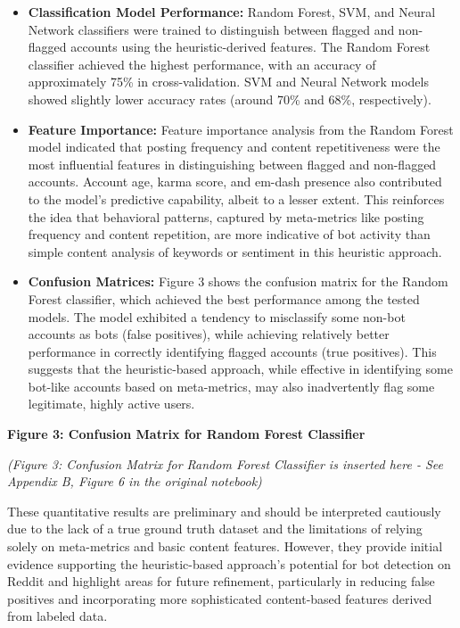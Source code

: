 \documentclass[
  12pt,
  letterpaper,
  DIV=11,
  numbers=noendperiod]{scrartcl}
\begin{document}
\begin{itemize}
\item
  \textbf{Classification Model Performance:} Random Forest, SVM, and
  Neural Network classifiers were trained to distinguish between flagged
  and non-flagged accounts using the heuristic-derived features. The
  Random Forest classifier achieved the highest performance, with an
  accuracy of approximately 75\% in cross-validation. SVM and Neural
  Network models showed slightly lower accuracy rates (around 70\% and
  68\%, respectively).
\item
  \textbf{Feature Importance:} Feature importance analysis from the
  Random Forest model indicated that posting frequency and content
  repetitiveness were the most influential features in distinguishing
  between flagged and non-flagged accounts. Account age, karma score,
  and em-dash presence also contributed to the model's predictive
  capability, albeit to a lesser extent. This reinforces the idea that
  behavioral patterns, captured by meta-metrics like posting frequency
  and content repetition, are more indicative of bot activity than
  simple content analysis of keywords or sentiment in this heuristic
  approach.
\item
  \textbf{Confusion Matrices:} Figure 3 shows the confusion matrix for
  the Random Forest classifier, which achieved the best performance
  among the tested models. The model exhibited a tendency to misclassify
  some non-bot accounts as bots (false positives), while achieving
  relatively better performance in correctly identifying flagged
  accounts (true positives). This suggests that the heuristic-based
  approach, while effective in identifying some bot-like accounts based
  on meta-metrics, may also inadvertently flag some legitimate, highly
  active users.
\end{itemize}

\textbf{Figure 3: Confusion Matrix for Random Forest Classifier}

\emph{(Figure 3: Confusion Matrix for Random Forest Classifier is
inserted here - See Appendix B, Figure 6 in the original notebook)}

These quantitative results are preliminary and should be interpreted
cautiously due to the lack of a true ground truth dataset and the
limitations of relying solely on meta-metrics and basic content
features. However, they provide initial evidence supporting the
heuristic-based approach's potential for bot detection on Reddit and
highlight areas for future refinement, particularly in reducing false
positives and incorporating more sophisticated content-based features
derived from labeled data.
\end{document}
